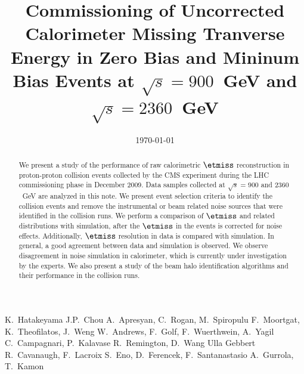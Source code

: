
\begin{titlepage}


   \date{\today}

  \title{Commissioning of Uncorrected Calorimeter Missing Tranverse Energy in Zero Bias and Mininum Bias Events at $\sqrt{s}=900$~GeV and $\sqrt{s}=2360$~GeV}

  \begin{Authlist}
    K.~Hatakeyama
    J.P.~Chou
    A.~Apresyan, C.~Rogan, M.~Spiropulu
    F.~Moortgat, K.~Theofilatos, J.~Weng
    W.~Andrews, F.~Golf, F.~Wuerthwein, A.~Yagil 
    C.~Campagnari, P.~Kalavase
    R.~Remington, D.~Wang
    Ulla Gebbert
    R.~Cavanaugh, F.~Lacroix 
    S.~Eno, D.~Ferencek, F.~Santanastasio
    A.~Gurrola, T.~Kamon
  \end{Authlist}



  \begin{abstract}
    
    We present a study of the performance of raw calorimetric $\etmiss$ reconstruction in
    proton-proton collision events collected by the CMS experiment during the LHC
    commissioning phase in December 2009. Data samples collected at
    $\sqrt{s}=900$ and $2360$~GeV are analyzed in this note. We present
     event selection criteria to identify the collision events and remove the instrumental or beam
    related noise sources that were identified in the collision
    runs. We perform a comparison of $\etmiss$ and related distributions with
    simulation, after the $\etmiss$ in the events is corrected for noise
    effects. Additionally, $\etmiss$ resolution in data is
    compared with simulation. In general, a good agreement between data and simulation is
    observed. We observe disagreement in noise simulation in
    calorimeter, which is currently under investigation by the
    experts. We also present a study of the beam halo identification
    algorithms and their performance in the collision runs.


\end{abstract}
\end{titlepage}
